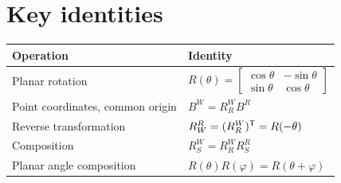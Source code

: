 \section{Key identities}
\begin{center}
\begin{tabular}{ll}
\toprule
Operation & Identity \\
\midrule
Planar rotation & $R(\theta)=\begin{bmatrix}\cos\theta&-\sin\theta\\\sin\theta&\cos\theta\end{bmatrix}$ \\[12pt]
Point coordinates, common origin & $B^W=R_R^W B^R$ \\
Reverse transformation & $R_W^R=(R_R^W)^{\mathsf T}=R(-\theta)$ \\
Composition & $R_S^W=R_R^W R_S^R$ \\
Planar angle composition & $R(\theta)R(\varphi)=R(\theta+\varphi)$ \\
\bottomrule
\end{tabular}
\end{center}

\clearpage

